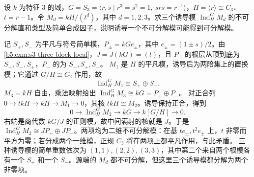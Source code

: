 \begin{optionalexercise}\label{b5:ex:08-induction-reduction-example}
	设 \(k\) 为特征 \(3\) 的域，\(G=S_3=\langle r,s\mid r^3=s^2=1,\ srs=r^{-1}\rangle\)，\(H=\langle r\rangle\cong C_3\)、\(t=r-1\)。令 \(M_d=kH/(t^d)\)，其中 \(d=1,2,3\)。求三个诱导模 \(\operatorname{Ind}_H^G M_d\) 的不可分解直和类型及简单合成因子，说明诱导一个不可分解模可能得到可分解模。
\end{optionalexercise}
\begin{solution}
	记 \(S_+,S_-\) 为平凡与符号简单模，\(P_\pm=kGe_\pm\)，其中 \(e_\pm=(1\pm s)/2\)。由\cref{b5:exm:s3-three-block-local}，\(J=J(kG)=(t)\)，且 \(P_+\) 的根层从顶到底为 \(S_+,S_-,S_+\)，\(P_-\) 的为 \(S_-,S_+,S_-\)。 \(M_1\) 是 \(H\) 的平凡模，诱导后为两陪集上的置换模；它通过 \(G/H\cong C_2\) 作用，故
	\[
		\operatorname{Ind}_H^G M_1\cong S_+\oplus S_-.
	\]
	\(M_3=kH\) 自由，乘法映射给出 \(\operatorname{Ind}_H^G M_3\cong kG=P_+\oplus P_-\)。 对正合列 \(0\to t kH\to kH\to M_1\to0\)，其核 \(t kH\cong M_2\)。诱导保持正合，得到
	\[
		0\to\operatorname{Ind}_H^G M_2\to kG\to k[G/H]\to0.
	\]
	右端是商代数 \(kG/J\) 的正则模，故中间满射的核就是 \(J\)。于是 \(\operatorname{Ind}_H^G M_2\cong JP_+\oplus JP_-\)。两项均为二维不可分解模：在基 \(te_\pm,t^2e_\pm\) 上，\(t\) 非零而平方为零；若分成两个一维模，正规 \(C_3\) 将在两项上都平凡作用，与此矛盾。 三种诱导模的简单重数依次为 \((1,1),(2,2),(3,3)\)，其中第二个来自两个根模各有一个 \(S_+\) 和一个 \(S_-\)。源端的 \(M_d\) 都不可分解，但这里三个诱导模都分解为两个非零项。
\end{solution}


